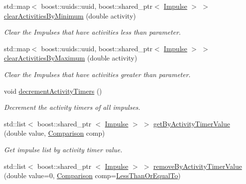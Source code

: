 \begin{DoxyCompactItemize}
std\-::map$<$ boost\-::uuids\-::uuid, \*
boost\-::shared\-\_\-ptr$<$ \hyperlink{classcryomesh_1_1components_1_1Impulse}{\-Impulse} $>$ $>$ \hyperlink{classcryomesh_1_1components_1_1ImpulseCollection_ab27eb4667bdb58c98e6614712f3b7373}{clear\-Activities\-By\-Minimum} (double activity)
\begin{DoxyCompactList}\small\item\em \-Clear the \-Impulses that have activities less than parameter. \end{DoxyCompactList}\item 
std\-::map$<$ boost\-::uuids\-::uuid, \*
boost\-::shared\-\_\-ptr$<$ \hyperlink{classcryomesh_1_1components_1_1Impulse}{\-Impulse} $>$ $>$ \hyperlink{classcryomesh_1_1components_1_1ImpulseCollection_a30ac8a9f8a401faf8277dd948ed2be15}{clear\-Activities\-By\-Maximum} (double activity)
\begin{DoxyCompactList}\small\item\em \-Clear the \-Impulses that have activities greater than parameter. \end{DoxyCompactList}\item 
void \hyperlink{classcryomesh_1_1components_1_1ImpulseCollection_a44ba846c61ae3d39730bd141072dc8e9}{decrement\-Activity\-Timers} ()
\begin{DoxyCompactList}\small\item\em \-Decrement the activity timers of all impulses. \end{DoxyCompactList}\item 
std\-::list$<$ boost\-::shared\-\_\-ptr\*
$<$ \hyperlink{classcryomesh_1_1components_1_1Impulse}{\-Impulse} $>$ $>$ \hyperlink{classcryomesh_1_1components_1_1ImpulseCollection_aea52c674f13597d808ad3e5f4f4bb9c1}{get\-By\-Activity\-Timer\-Value} (double value, \hyperlink{classcryomesh_1_1components_1_1ImpulseCollection_a3682719f1c0bd471e8c5a19b39cc285d}{\-Comparison} comp)
\begin{DoxyCompactList}\small\item\em \-Get impulse list by activity timer value. \end{DoxyCompactList}\item 
std\-::list$<$ boost\-::shared\-\_\-ptr\*
$<$ \hyperlink{classcryomesh_1_1components_1_1Impulse}{\-Impulse} $>$ $>$ \hyperlink{classcryomesh_1_1components_1_1ImpulseCollection_a317b84fe238bd4ff6bb8eda97b35cf1a}{remove\-By\-Activity\-Timer\-Value} (double value=0, \hyperlink{classcryomesh_1_1components_1_1ImpulseCollection_a3682719f1c0bd471e8c5a19b39cc285d}{\-Comparison} comp=\hyperlink{classcryomesh_1_1components_1_1ImpulseCollection_a3682719f1c0bd471e8c5a19b39cc285dabb82adff3882cdd74faaef695b6bc82d}{\-Less\-Than\-Or\-Equal\-To})

\end{DoxyCompactItemize}
